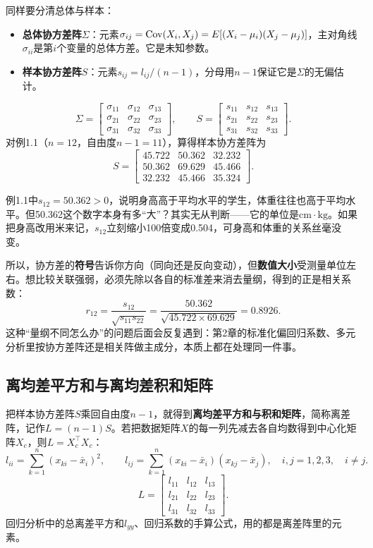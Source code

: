 同样要分清总体与样本：
\begin{itemize}
\item \textbf{总体协方差阵$\Sigma$}：元素$\sigma_{ij}=\operatorname{Cov}(X_i,X_j)=E[(X_i-\mu_i)(X_j-\mu_j)]$，主对角线$\sigma_{ii}$是第$i$个变量的总体方差。它是未知参数。
\item \textbf{样本协方差阵$S$}：元素$s_{ij}=l_{ij}/(n-1)$，分母用$n-1$保证它是$\Sigma$的无偏估计。
\end{itemize}
\[
\Sigma=\begin{bmatrix}\sigma_{11}&\sigma_{12}&\sigma_{13}\\
\sigma_{21}&\sigma_{22}&\sigma_{23}\\\sigma_{31}&\sigma_{32}&\sigma_{33}\end{bmatrix},
\qquad S=\begin{bmatrix}s_{11}&s_{12}&s_{13}\\s_{21}&s_{22}&s_{23}\\s_{31}&s_{32}&s_{33}\end{bmatrix}.
\]
对例1.1（$n=12$，自由度$n-1=11$），算得样本协方差阵为
\[
S=\begin{bmatrix}45.722&50.362&32.232\\50.362&69.629&45.466\\32.232&45.466&35.324\end{bmatrix}.
\]
\begin{sikao}[协方差的数值为什么不能直接比大小？]
例1.1中$s_{12}=50.362>0$，说明身高高于平均水平的学生，体重往往也高于平均水平。但50.362这个数字本身有多“大”？其实无从判断——它的单位是$\mathrm{cm\cdot kg}$。如果把身高改用米来记，$s_{12}$立刻缩小100倍变成0.504，可身高和体重的关系丝毫没变。

所以，协方差的\textbf{符号}告诉你方向（同向还是反向变动），但\textbf{数值大小}受测量单位左右。想比较关联强弱，必须先除以各自的标准差来消去量纲，得到的正是相关系数：
\[
r_{12}=\frac{s_{12}}{\sqrt{s_{11}s_{22}}}=\frac{50.362}{\sqrt{45.722\times69.629}}=0.8926 .
\]
这种“量纲不同怎么办”的问题后面会反复遇到：第2章的标准化偏回归系数、多元分析里按协方差阵还是相关阵做主成分，本质上都在处理同一件事。
\end{sikao}

\subsection{离均差平方和与离均差积和矩阵}
把样本协方差阵$S$乘回自由度$n-1$，就得到\textbf{离均差平方和与积和矩阵}，简称离差阵，记作$L=(n-1)S$。若把数据矩阵$X$的每一列先减去各自均数得到中心化矩阵$X_c$，则$L=X_c^\top X_c$：
\[
l_{ii}=\sum_{k=1}^{n}(x_{ki}-\bar x_i)^2,\qquad
l_{ij}=\sum_{k=1}^{n}(x_{ki}-\bar x_i)(x_{kj}-\bar x_j),
\quad i,j=1,2,3,\quad i\ne j.
\]
\[
L=\begin{bmatrix}l_{11}&l_{12}&l_{13}\\l_{21}&l_{22}&l_{23}\\l_{31}&l_{32}&l_{33}\end{bmatrix}.
\]
回归分析中的总离差平方和$l_{yy}$、回归系数的手算公式，用的都是离差阵里的元素。

